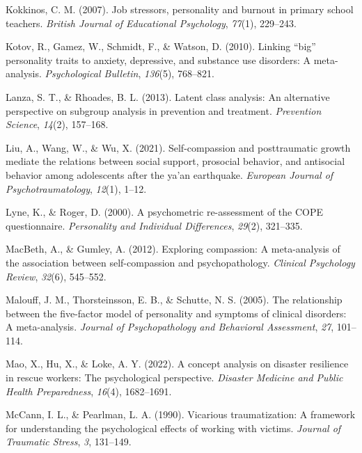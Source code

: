 \documentclass[
  man]{apa6}
\newlength{\cslhangindent}
\newlength{\cslentryspacingunit} %
\newenvironment{CSLReferences}[2] %
 {%
  \setlength{\parindent}{0pt}
  \ifodd #1
  \let\oldpar\par
  \def\par{\hangindent=\cslhangindent\oldpar}
  \fi
  \setlength{\parskip}{#2\cslentryspacingunit}
 }%
 {}
\begin{document}
\begin{CSLReferences}{1}{0}
\leavevmode{}%
Kokkinos, C. M. (2007). Job stressors, personality and burnout in primary school teachers. \emph{British Journal of Educational Psychology}, \emph{77}(1), 229--243.

\leavevmode{}%
Kotov, R., Gamez, W., Schmidt, F., \& Watson, D. (2010). Linking {``big''} personality traits to anxiety, depressive, and substance use disorders: A meta-analysis. \emph{Psychological Bulletin}, \emph{136}(5), 768--821.

\leavevmode{}%
Lanza, S. T., \& Rhoades, B. L. (2013). Latent class analysis: An alternative perspective on subgroup analysis in prevention and treatment. \emph{Prevention Science}, \emph{14}(2), 157--168.

\leavevmode{}%
Liu, A., Wang, W., \& Wu, X. (2021). Self-compassion and posttraumatic growth mediate the relations between social support, prosocial behavior, and antisocial behavior among adolescents after the ya'an earthquake. \emph{European Journal of Psychotraumatology}, \emph{12}(1), 1--12.

\leavevmode{}%
Lyne, K., \& Roger, D. (2000). A psychometric re-assessment of the COPE questionnaire. \emph{Personality and Individual Differences}, \emph{29}(2), 321--335.

\leavevmode{}%
MacBeth, A., \& Gumley, A. (2012). Exploring compassion: A meta-analysis of the association between self-compassion and psychopathology. \emph{Clinical Psychology Review}, \emph{32}(6), 545--552.

\leavevmode{}%
Malouff, J. M., Thorsteinsson, E. B., \& Schutte, N. S. (2005). The relationship between the five-factor model of personality and symptoms of clinical disorders: A meta-analysis. \emph{Journal of Psychopathology and Behavioral Assessment}, \emph{27}, 101--114.

\leavevmode{}%
Mao, X., Hu, X., \& Loke, A. Y. (2022). A concept analysis on disaster resilience in rescue workers: The psychological perspective. \emph{Disaster Medicine and Public Health Preparedness}, \emph{16}(4), 1682--1691.

\leavevmode{}%
McCann, I. L., \& Pearlman, L. A. (1990). Vicarious traumatization: A framework for understanding the psychological effects of working with victims. \emph{Journal of Traumatic Stress}, \emph{3}, 131--149.


\end{CSLReferences}
\end{document}
